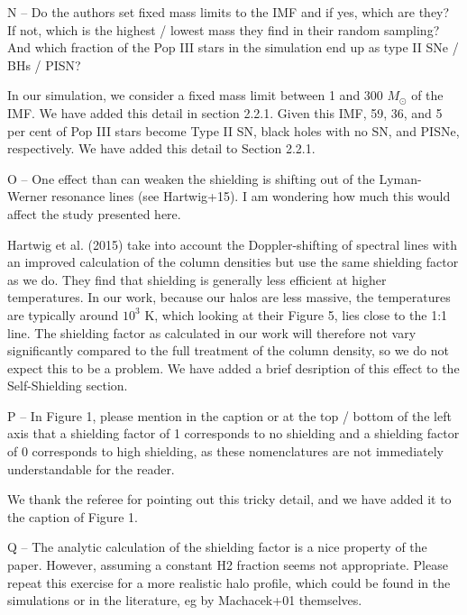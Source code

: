 \documentclass[11pt]{article}
\newenvironment{referee}[1][]{%
    \ignorespaces%
    \begin{mdframed}[style=myquotestyle,#1]%
}{%
    \end{mdframed}%
    \ignorespacesafterend%
}%
\begin{document}
\begin{referee}
N -- Do the authors set fixed mass limits to the IMF and if yes, which are they?  If not, which is the highest / lowest mass they find in their random sampling?  And which fraction of the Pop III stars in the simulation end up as type II SNe / BHs / PISN?
\end{referee}

In our simulation, we consider a fixed mass limit between 1 and 300 $M_{\odot}$ of the IMF. We have added this detail in section 2.2.1.  Given this IMF, 59, 36, and 5 per cent of Pop III stars become Type II SN, black holes with no SN, and PISNe, respectively. We have added this detail to Section 2.2.1.

\begin{referee}
O -- One effect than can weaken the shielding is shifting out of the Lyman-Werner resonance lines (see Hartwig+15). I am wondering how much this would affect the study presented here.
\end{referee}

Hartwig et al. (2015) take into account the Doppler-shifting of spectral lines with an improved calculation of the column densities but use the same shielding factor as we do. They find that shielding is generally less efficient at higher temperatures. In our work, because our halos are less massive, the temperatures are typically around $10^{3}$ K, which looking at their Figure 5, lies close to the 1:1 line. The shielding factor as calculated in our work will therefore not vary significantly compared to the full treatment of the column density, so we do not expect this to be a problem.  We have added a brief desription of this effect to the \hh{} Self-Shielding section. 

\begin{referee}
P -- In Figure 1, please mention in the caption or at the top / bottom of the left axis that a shielding factor of 1 corresponds to no shielding and a shielding factor of 0 corresponds to high shielding, as these nomenclatures are not immediately understandable for the reader.
\end{referee}

We thank the referee for pointing out this tricky detail, and we have added it to the caption of Figure 1.

\begin{referee}
Q -- The analytic calculation of the shielding factor is a nice property of the paper. However, assuming a constant H2 fraction seems not appropriate. Please repeat this exercise for a more realistic halo profile, which could be found in the simulations or in the literature, eg by Machacek+01 themselves.
\end{referee}
\end{document}
